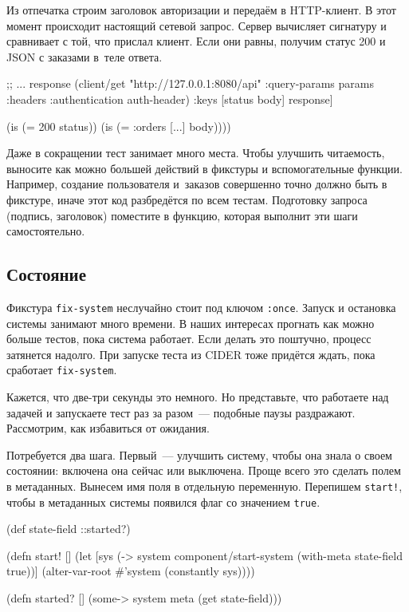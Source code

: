 Из отпечатка строим заголовок авторизации и передаём в HTTP-клиент. В этот
момент происходит настоящий сетевой запрос. Сервер вычисляет сигнатуру и
сравнивает с той, что прислал клиент. Если они равны, получим статус 200 и JSON
с заказами в~теле ответа.

\begin{english}
  \begin{clojure}
        ;; ...
        response (client/get "http://127.0.0.1:8080/api"
                   {:query-params params
                    :headers {:authentication auth-header}})
        {:keys [status body]} response]

    (is (= 200 status))
    (is (= {:orders [...]} body))))
  \end{clojure}
\end{english}

Даже в сокращении тест занимает много места. Чтобы улучшить читаемость, выносите
как можно большей действий в фикстуры и вспомогательные функции. Например,
создание пользователя и~заказов совершенно точно должно быть в фикстуре, иначе
этот код разбредётся по всем тестам. Подготовку запроса (подпись, заголовок)
поместите в функцию, которая выполнит эти шаги самостоятельно.

\subsection{Состояние}

Фикстура \verb|fix-system| неслучайно стоит под ключом \verb|:once|. Запуск
и остановка системы занимают много времени. В наших интересах прогнать как можно
больше тестов, пока система работает. Если делать это поштучно, процесс
затянется надолго. При запуске теста из CIDER тоже придётся ждать, пока
сработает \verb|fix-system|.

Кажется, что две-три секунды это немного. Но представьте, что работаете над
задачей и запускаете тест раз за разом~--- подобные паузы
раздражают. Рассмотрим, как избавиться от ожидания.


Потребуется два шага. Первый~--- улучшить систему, чтобы она знала о своем
состоянии: включена она сейчас или выключена. Проще всего это сделать полем в
метаданных. Вынесем имя поля в отдельную переменную. Перепишем \verb|start!|,
чтобы в метаданных системы появился флаг со значением \verb|true|.

\begin{english}
  \begin{clojure}
(def state-field ::started?)

(defn start! []
  (let [sys (-> system
                component/start-system
                (with-meta {state-field true}))]
    (alter-var-root #'system (constantly sys))))

(defn started? []
  (some-> system meta (get state-field)))
  \end{clojure}
\end{english}

